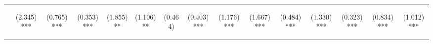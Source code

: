 \begin{center}
\begin{tabular}{lcccccccccccccc}
\hline  & \begin{normalsize}(2.345)***\end{normalsize} & \begin{normalsize}(0.765)***\end{normalsize} & \begin{normalsize}(0.353)***\end{normalsize} & \begin{normalsize}(1.855)**\end{normalsize} & \begin{normalsize}(1.106)**\end{normalsize} & \begin{normalsize}(0.464)\end{normalsize} & \begin{normalsize}(0.403)***\end{normalsize} & \begin{normalsize}(1.176)***\end{normalsize} & \begin{normalsize}(1.667)***\end{normalsize} & \begin{normalsize}(0.484)***\end{normalsize} & \begin{normalsize}(1.330)***\end{normalsize} & \begin{normalsize}(0.323)***\end{normalsize} & \begin{normalsize}(0.834)***\end{normalsize} & \begin{normalsize}(1.012)***\end{normalsize}\\

\end{tabular}
\end{center}
